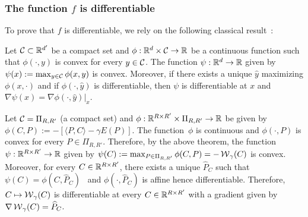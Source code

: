 \subsubsection{The function $f$ is differentiable}
\label{subsubsec:f:smooth}

To  prove that  $f$  is differentiable,  we rely  on  the following  classical
result~\cite{Danskin}:
\begin{theorem}
  Let    $\mathcal{C}     \subset    \mathbb{R}^{d'}$    be    a     compact    set    and
  $\phi: \mathbb{R}^{d} \times \mathcal{C} \rightarrow \mathbb{R}$ be a continuous function such
  that  $\phi(\cdot, y)$  is convex  for every  $y \in  \mathcal{C}$.  The  function
  $\psi:\mathbb{R}^{d} \to \mathbb{R}$ given by $\psi(x) := \max_{y \in \mathcal{C}} \phi(x, y)$
  is  convex.   Moreover,  if  there  exists  a  unique  $\hat{y}$  maximizing
  $\phi(x,  \cdot)$  and if  $\phi(\cdot,  \hat{y})$  is differentiable,  then
  $\psi$         is         differentiable          at         $x$         and
  $\nabla \psi(x) = \nabla \phi(\cdot, \hat{y})|_{x}$.
\end{theorem}
Let      $\mathcal{C}      =      \Pi_{R,R'}$     (a      compact      set)      and
$\phi:\mathbb{R}^{R\times   R'}   \times   \Pi_{R,R'}   \to  \mathbb{R}$   be   given   by
$\phi(C,P) := -[\langle P, C \rangle  - \gamma E(P)]$.  The function~$\phi$ is
continuous  and $\phi(\cdot,  P)$  is  convex for  every  $P \in  \Pi_{R,R'}$.
Therefore,       by      the       above      theorem,       the      function
$\psi     :     \mathbb{R}^{R     \times      R'}     \to     \mathbb{R}$     given     by
$\psi(C)  :=  \max_{P \in  \Pi_{R,R'}}  \phi(C,P)  = -\operatorname{\mathcal{W}}_{\gamma}  (C)$  is
convex. Moreover, for every $C \in  \mathbb{R}^{R \times R'}$, there exists a unique
$\widehat{P}_{C}$                           such                          that
$\psi(C) = \phi(C, \widehat{P}_{C})$~\cite[Proposition 4.3]{pmlr-v32-cuturi14}
and $\phi(\cdot, \widehat{P}_{C})$ is affine hence differentiable.  Therefore,
$C\mapsto      \operatorname{\mathcal{W}}_{\gamma}(C)$     is      differentiable     at      every
$C    \in    \mathbb{R}^{R    \times    R'}$    with    a    gradient    given    by
$\nabla\operatorname{\mathcal{W}}_{\gamma}(C) = \widehat{P}_{C}$.

